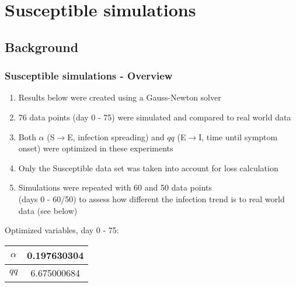 \documentclass{beamer}
\begin{document}
\section{Susceptible simulations}
\subsection{Background}
\begin{frame}
	\frametitle{Susceptible simulations - Overview}
	\begin{enumerate}[$\bullet$]
		\item Results below were created using a Gauss-Newton solver
		\item 76 data points (day 0 - 75) were simulated and compared to real world data
		\item Both $\alpha$ (S$\rightarrow$E, infection spreading) and $qq$ (E$\rightarrow$I, time until symptom onset) were optimized in these experiments
		\item Only the Susceptible data set was taken into account for loss calculation
		\item Simulations were repeated with 60 and 50 data points\\(days 0 - 60/50) to assess how different the infection trend is to real world data (see below)
	\end{enumerate}
	\begin{center}
	Optimized variables, day 0 - 75:
	\begin{tabular}{|c|c|}
		\hline $\alpha$ & 0.197630304 \\
		\hline $qq$ & 6.675000684 \\ \hline
	\end{tabular}
	\end{center}
\end{frame}
\end{document}
